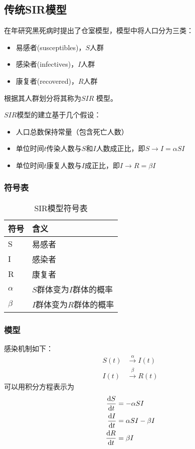 \subsection{传统SIR模型}
\citeauthor{对流行病数学理论的贡献}在\citeyear{对流行病数学理论的贡献}年研究黑死病时提出了仓室模型，模型中将人口分为三类：
\begin{itemize}
	\item 易感者(susceptibles)，$S$人群
	\item 感染者(infectives)，$I$人群
	\item 康复者(recovered)，$R$人群
\end{itemize}
\par 根据其人群划分将其称为$SIR$
\cite{对流行病数学理论的贡献}模型。
\par $SIR$模型的建立基于几个假设\cite{对流行病数学理论的贡献}：
\begin{itemize}
	\item 人口总数保持常量（包含死亡人数）
	\item 单位时间$t$传染人数与$S$和$I$人数成正比，即$S\to I = \alpha SI$
	\item 单位时间$t$康复人数与$I$成正比，即$I\to R = \beta I$
\end{itemize}
\subsubsection{符号表}
\begin{table}[H]
	\centering
	\caption{SIR模型符号表}
	\label{table:SIR模型符号表}
	\begin{tabular}{ll}
		\hline
		符号     & 含义                     \\
		\hline
		S        & 易感者                   \\
		I        & 感染者                   \\
		R        & 康复者                   \\
		$\alpha$ & $S$群体变为$I$群体的概率 \\
		$\beta$  & $I$群体变为$R$群体的概率 \\
		\hline
	\end{tabular}
\end{table}
\subsubsection{模型}
\par 感染机制如下：
\begin{align}
	S(t) & \xrightarrow \alpha I(t) \\
	I(t) & \xrightarrow \beta R(t)
\end{align}
可以用积分方程表示为
\begin{align}
	\frac{\mathrm{d}S}{\mathrm{d}t} & = -\alpha SI          \\
	\frac{\mathrm{d}I}{\mathrm{d}t} & = \alpha SI - \beta I \\
	\frac{\mathrm{d}R}{\mathrm{d}t} & = \beta I
\end{align}
